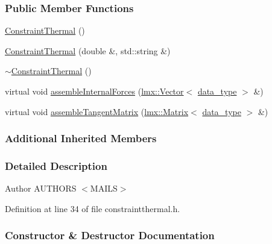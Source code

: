 \subsubsection*{Public Member Functions}
\begin{DoxyCompactItemize}
\item 
\hyperlink{classmknix_1_1_constraint_thermal_aa14c13643ac1ae7ca01bf2fe3666c56c}{Constraint\+Thermal} ()
\item 
\hyperlink{classmknix_1_1_constraint_thermal_a5e67f47d92254309c379a1b0ebeb3f8d}{Constraint\+Thermal} (double \&, std\+::string \&)
\item 
\hyperlink{classmknix_1_1_constraint_thermal_a1c12a6558f4e739bc9d1619417d0b48f}{$\sim$\+Constraint\+Thermal} ()
\item 
virtual void \hyperlink{classmknix_1_1_constraint_thermal_a926615c3588a63ca1b5066929406ee0c}{assemble\+Internal\+Forces} (\hyperlink{classlmx_1_1_vector}{lmx\+::\+Vector}$<$ \hyperlink{namespacemknix_a16be4b246fbf2cceb141e3a179111020}{data\+\_\+type} $>$ \&)
\item 
virtual void \hyperlink{classmknix_1_1_constraint_thermal_abf43105dbabda45f40b7919444293dbf}{assemble\+Tangent\+Matrix} (\hyperlink{classlmx_1_1_matrix}{lmx\+::\+Matrix}$<$ \hyperlink{namespacemknix_a16be4b246fbf2cceb141e3a179111020}{data\+\_\+type} $>$ \&)
\end{DoxyCompactItemize}
\subsubsection*{Additional Inherited Members}


\subsubsection{Detailed Description}
\begin{DoxyAuthor}{Author}
A\+U\+T\+H\+O\+R\+S $<$\+M\+A\+I\+L\+S$>$ 
\end{DoxyAuthor}


Definition at line 34 of file constraintthermal.\+h.



\subsubsection{Constructor \& Destructor Documentation}
\hypertarget{classmknix_1_1_constraint_thermal_aa14c13643ac1ae7ca01bf2fe3666c56c}{}
